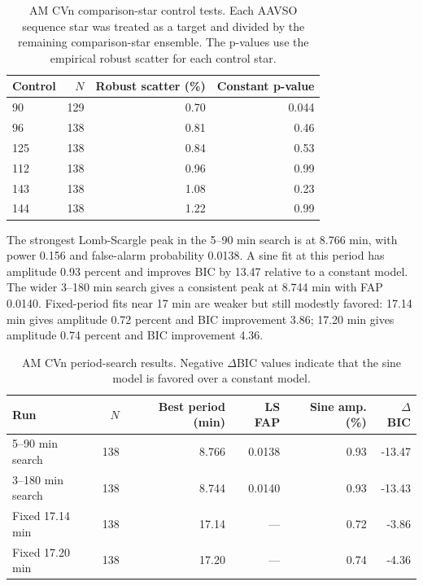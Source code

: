 \documentclass[11pt]{article}
\begin{document}
\begin{table}[H]
  \centering
  \caption{AM CVn comparison-star control tests. Each AAVSO sequence star was
  treated as a target and divided by the remaining comparison-star ensemble.
  The p-values use the empirical robust scatter for each control star.}
  \label{tab:am-controls}
  \begin{tabular}{lrrr}
    \toprule
    Control & $N$ & Robust scatter (\%) & Constant p-value \\
    \midrule
    90  & 129 & 0.70 & 0.044 \\
    96  & 138 & 0.81 & 0.46 \\
    125 & 138 & 0.84 & 0.53 \\
    112 & 138 & 0.96 & 0.99 \\
    143 & 138 & 1.08 & 0.23 \\
    144 & 138 & 1.22 & 0.99 \\
    \bottomrule
  \end{tabular}
\end{table}

The strongest Lomb-Scargle peak in the 5--90 min search is at 8.766 min, with
power 0.156 and false-alarm probability 0.0138. A sine fit at this period has
amplitude 0.93 percent and improves BIC by 13.47 relative to a constant model.
The wider 3--180 min search gives a consistent peak at 8.744 min with FAP
0.0140. Fixed-period fits near 17 min are weaker but still modestly favored:
17.14 min gives amplitude 0.72 percent and BIC improvement 3.86; 17.20 min
gives amplitude 0.74 percent and BIC improvement 4.36.

\begin{table}[H]
  \centering
  \caption{AM CVn period-search results. Negative $\Delta$BIC values indicate
  that the sine model is favored over a constant model.}
  \label{tab:am-periods}
  \begin{tabular}{lrrrrr}
    \toprule
    Run & $N$ & Best period (min) & LS FAP & Sine amp. (\%) & $\Delta$BIC \\
    \midrule
    5--90 min search  & 138 & 8.766 & 0.0138 & 0.93 & -13.47 \\
    3--180 min search & 138 & 8.744 & 0.0140 & 0.93 & -13.43 \\
    Fixed 17.14 min   & 138 & 17.14 & ---    & 0.72 & -3.86 \\
    Fixed 17.20 min   & 138 & 17.20 & ---    & 0.74 & -4.36 \\
    \bottomrule
  \end{tabular}
\end{table}
\end{document}
